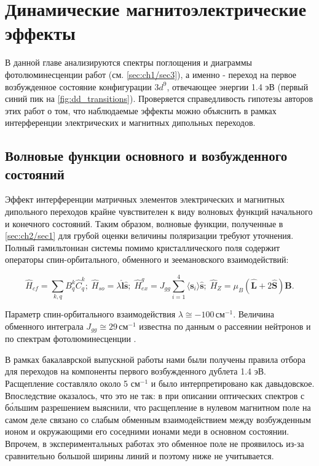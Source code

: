 \chapter{Динамические магнитоэлектрические эффекты}\label{ch:ch3}

В данной главе анализируются спектры поглощения и диаграммы фотолюминесценции работ \cite{Toyoda2015, Saito2008prl, Toyoda2016} (см. \cref{sec:ch1/sec3}), а именно - переход на первое возбужденное состояние конфигурации \(3d^9\), отвечающее энергии 1.4 эВ (первый синий пик на \cref{fig:dd_transitions}). Проверяется справедливость гипотезы авторов этих работ о том, что наблюдаемые эффекты можно объяснить в рамках интерференции электрических и магнитных дипольных переходов.

\section{Волновые функции основного и возбужденного состояний}\label{sec:ch3/sect1}

Эффект интерференции матричных элементов электрических и магнитных дипольного переходов крайне чувствителен к виду волновых функций начального и конечного состояний. Таким образом, волновые функции, полученные в \cref{sec:ch2/sec1} для грубой оценки величины поляризации требуют уточнения. Полный гамильтониан системы помимо кристаллического поля содержит операторы спин-орбитального, обменного и зеемановского взаимодействий:

\begin{equation}
	\label{eq:Hamiltonian}
	\hat{H}_{cf}=\sum_{k, q} B_{q}^{k}\hat{C}_{q}^{k}; \; \hat{H}_{so} = \lambda \hat{\bm{l}} \hat{\bm{s}}; \; \hat{H}_{ex}^{g} = J_{gg} \sum_{i=1}^{4} \langle \bm{s}_i \rangle \hat{\bm{s}}; \; \hat{H}_{Z} = \mu_B (\hat{\bm{L}} + 2\hat{\bm{S}}) \bm{B}.
\end{equation}

Параметр спин-орбитального взаимодействия $\lambda \cong -100\,\text{см}^{-1}$. Величина обменного интеграла $J_{gg} \cong 29\,\text{см}^{-1}$ известна по данным о рассеянии нейтронов и по спектрам фотолюминесценции \cite{Toyoda2016, Boehm2002}. 

В рамках бакалаврской выпускной работы нами были получены правила отбора для переходов на компоненты первого возбужденного дублета 1.4 эВ. Расщепление составляло около 5 см$^{-1}$ и было интерпретировано как давыдовское. Впоследствие оказалось, что это не так: в \cite{Kopteva2022} при описании оптических спектров с б\'{о}льшим разрешением выяснили, что расщепление в нулевом магнитном поле на самом деле связано со слабым обменным взаимодействием между возбужденным ионом и окружающими его соседними ионами меди в основном состоянии. Впрочем, в экспериментальных работах \cite{Toyoda2015, Toyoda2016} это обменное поле не проявилось из-за сравнительно большой ширины линий и поэтому ниже не учитывается.

